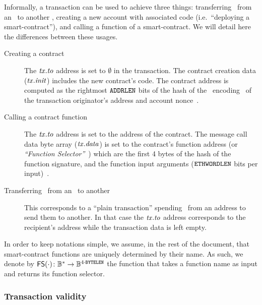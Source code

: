 Informally, a transaction can be used to achieve three things: transferring \wei~from an \eoa~to another \eoa, creating a new account with associated code (i.e.~``deploying a smart-contract''), and calling a function of a smart-contract. We will detail here the differences between these usages.
\begin{description}
    \item[Creating a contract] The $\mathit{tx}.\mathit{to}$ address is set to $\emptyset$ in the transaction. The contract creation data ($\mathit{tx}.\mathit{init}$) includes the new contract's code. The contract address is computed as the rightmost $\mathtt{ADDRLEN}$ bits of the  hash of the \rlp~encoding~\cite{ethrlp} of the transaction originator's address and account nonce~\cite[Section 6]{ethyellowpaper}.
    \item[Calling a contract function] The $\mathit{tx}.\mathit{to}$ address is set to the address of the contract. The message call data byte array ($\mathit{tx}.\mathit{data}$) is set to the contract's function address (or \emph{``Function Selector''}~\cite{abi-function-selector}) which are the first 4 bytes of the  hash of the function signature, and the function input arguments ($\mathtt{ETHWORDLEN}$ bits per input)~\cite[Section 8]{ethyellowpaper}.
    \item[Transferring \wei~from an \eoa~to another \eoa] This corresponds to a ``plain transaction'' spending \wei~from an address to send them to another. In that case the $\mathit{tx}.\mathit{to}$ address corresponds to the recipient's address while the transaction data is left empty.
\end{description}

\begin{notebox}
    In order to keep notations simple, we assume, in the rest of the document, that smart-contract functions are uniquely determined by their name. As such, we denote by $\mathsf{FS({\cdot})} \colon \mathbb{B}^{*} \to \mathbb{B}^{4 \cdot \mathtt{BYTELEN}}$ the function that takes a function name as input and returns its function selector.
\end{notebox}

\subsubsection{Transaction validity}\label{preliminaries:ethereum:eth-tx:tx-validity}

